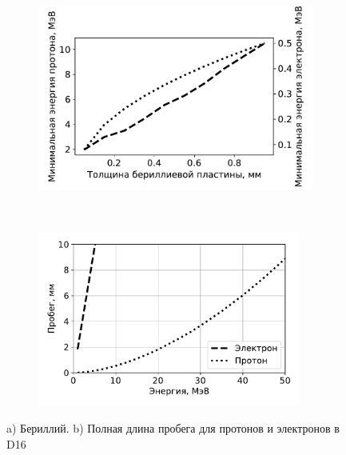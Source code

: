 \documentclass[12pt, a4paper, notitlepage, onecolumn]{article}
\begin{document}
\begin{figure}[ht!]
	\begin{subfigure}[b]{0.5\textwidth}
    	\includegraphics[width=0.95\linewidth]{pictures/03_berillium.pdf}
        \caption{}
        \label{pic-02-a}
    \end{subfigure}
	~
    \begin{subfigure}[b]{0.5\textwidth}
		\includegraphics[width=0.95\textwidth]{pictures/04_casing.pdf}
        \caption{}
        \label{pic-02-b}
    \end{subfigure}
    \caption{ a) Бериллий. b) Полная длина пробега для протонов и электронов в D16}
\end{figure}
\end{document}

